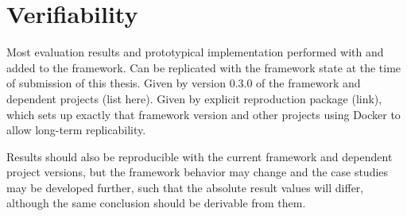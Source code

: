 \chapter{Verifiability}
\label{chap:appendix:verifiability}


Most evaluation results and prototypical implementation performed with and added to the \vitruv framework.
Can be replicated with the framework state at the time of submission of this thesis.
Given by version 0.3.0 of the framework and dependent projects (list here).
Given by explicit reproduction package (link), which sets up exactly that framework version and other projects using Docker to allow long-term replicability.

Results should also be reproducible with the current framework and dependent project versions, but the framework behavior may change and the case studies may be developed further, such that the absolute result values will differ, although the same conclusion should be derivable from them.
